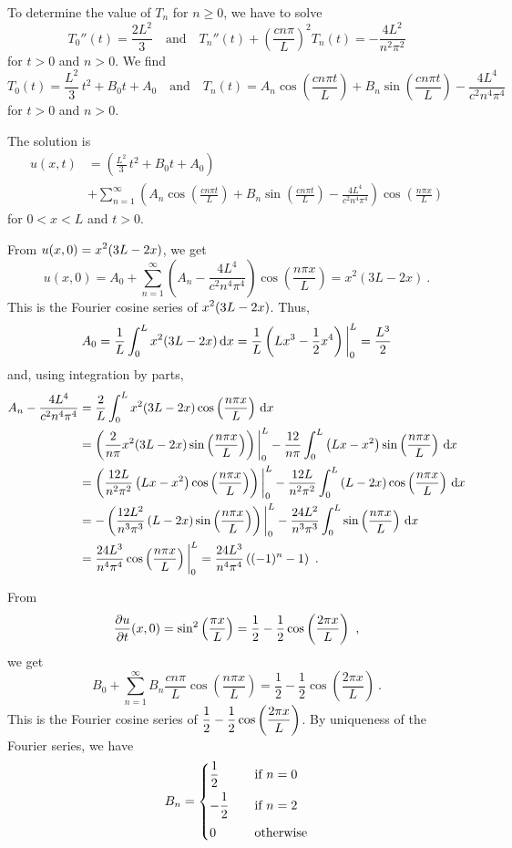 \begin{egg}
To determine the value of $T_n$ for $n\geq 0$, we have to solve
\[
T_0''(t) = \frac{2L^2}{3} \quad \text{and} \quad
T_n''(t) + \left(\frac{c n\pi}{L}\right)^2 T_n(t) = -\frac{4L^2}{n^2\pi^2}
\]
for $t>0$ and $n>0$.  We find
\[
T_0(t) = \frac{L^2}{3}\,t^2 + B_0t + A_0 \quad \text{and} \quad
T_n(t) = A_n\cos\left(\frac{c n \pi t}{L}\right)
+ B_n \sin\left(\frac{c n \pi t}{L}\right) -
\frac{4 L^4}{c^2n^4\pi^4}
\]
for $t>0$ and $n>0$.

The solution is
\begin{align*}
u(x,t) &= \left(\frac{L^2}{3}\,t^2 + B_0t + A_0\right) \\
&+ \sum_{n=1}^\infty 
\left( A_n\cos\left(\frac{c n \pi t}{L}\right)
+ B_n \sin\left(\frac{c n \pi t}{L}\right) -
\frac{4 L^4}{c^2n^4\pi^4} \right)\cos\left(\frac{n\pi x}{L}\right)
\end{align*}
for $0<x<L$ and $t>0$.

From $\displaystyle u(x,0) = x^2(3L-2x)$, we get
\[
u(x,0) = A_0
+ \sum_{n=1}^\infty 
\left( A_n - \frac{4 L^4}{c^2n^4\pi^4} \right)\cos\left(\frac{n\pi x}{L}\right)
= x^2(3L-2x) \ .
\]
This is the Fourier cosine series of $\displaystyle x^2(3L-2x)$.  Thus,
\[
A_0 = \frac{1}{L}\int_0^L x^2(3L-2x) \,\mathrm{d}{x} =
\frac{1}{L}\left( Lx^3 - \frac{1}{2} x^4\right)\bigg|_0^L
= \frac{L^3}{2}
\]
and, using integration by parts,
\begin{align*}
A_n - \frac{4 L^4}{c^2n^4\pi^4} &= \frac{2}{L}\int_0^L x^2(3L-2x)
\cos\left(\frac{n\pi x}{L}\right) \,\mathrm{d}{x} \\
&= \left(\frac{2}{n\pi} x^2(3L-2x)
\sin\left(\frac{n\pi x}{L}\right)\right)\bigg|_0^L
- \frac{12}{n\pi} \int_0^L \left(Lx-x^2\right)
\sin\left(\frac{n\pi x}{L}\right)\,\mathrm{d}{x} \\
&= \left( \frac{12L}{n^2\pi^2} \left(Lx-x^2\right)
\cos\left(\frac{n\pi x}{L}\right)\right)\bigg|_0^L
- \frac{12L}{n^2\pi^2} \int_0^L \left(L-2x\right)
\cos\left(\frac{n\pi x}{L}\right) \,\mathrm{d}{x} \\
&= - \left( \frac{12L^2}{n^3\pi^3} \left(L-2x\right)
\sin\left(\frac{n\pi x}{L}\right) \right)\bigg|_0^L
- \frac{24L^2}{n^3\pi^3} \int_0^L
\sin\left(\frac{n\pi x}{L}\right) \,\mathrm{d}{x} \\
&= \frac{24L^3}{n^4\pi^4}
\cos\left(\frac{n\pi x}{L}\right)\bigg|_0^L 
= \frac{24L^3}{n^4\pi^4} \left( (-1)^n -1 \right) \ .
\end{align*}

From
\[
\pdydx{u}{t}(x,0) = \sin^2\left(\frac{\pi x}{L}\right)
= \frac{1}{2} - \frac{1}{2}\cos\left(\frac{2 \pi x}{L}\right) \ ,
\]
we get
\[
B_0
+ \sum_{n=1}^\infty B_n\frac{cn\pi}{L}\cos\left(\frac{n\pi x}{L}\right)
= \frac{1}{2} - \frac{1}{2}\cos\left(\frac{2 \pi x}{L}\right) \ .
\]
This is the Fourier cosine series of $\displaystyle
\frac{1}{2} - \frac{1}{2}\cos\left(\frac{2 \pi x}{L}\right)$.  By
uniqueness of the Fourier series, we have
\[
B_n =
\begin{cases}
\displaystyle \frac{1}{2} & \quad \text{if} \ n=0 \\[0.7em]
\displaystyle -\frac{1}{2} & \quad \text{if} \ n=2 \\[0.7em]
0 & \quad \text{otherwise}
\end{cases}
\]


\end{egg}
